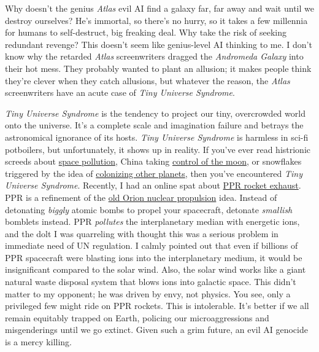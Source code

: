 Why doesn't the genius \emph{Atlas} evil AI find a galaxy far, far away
and wait until we destroy ourselves? He's immortal, so there's no hurry,
so it takes a few millennia for humans to self-destruct, big freaking
deal. Why take the risk of seeking redundant revenge? This doesn't seem
like genius-level AI thinking to me. I don't know why the retarded
\emph{Atlas} screenwriters dragged the \emph{Andromeda Galaxy} into
their hot mess. They probably wanted to plant an allusion; it makes
people think they're clever when they catch allusions, but whatever the
reason, the \emph{Atlas} screenwriters have an acute case of \emph{Tiny
Universe Syndrome}.

\emph{Tiny Universe Syndrome} is the tendency to project our tiny,
overcrowded world onto the universe. It's a complete scale and
imagination failure and betrays the astronomical ignorance of its hosts.
\emph{Tiny Universe Syndrome} is harmless in sci-fi potboilers, but
unfortunately, it shows up in reality. If you've ever read histrionic
screeds about
\href{https://www.weforum.org/agenda/2022/07/environmental-impact-space-debris-how-to-solve-it/}{space
pollution}, China taking
\href{https://www.npr.org/2024/05/06/1249249941/nasa-bill-nelson-moon-artemis-china-starliner}{control
of the moon}, or snowflakes triggered by the idea of
\href{https://theconversation.com/the-billionaire-space-race-reflects-a-colonial-mindset-that-fails-to-imagine-a-different-world-165235}{colonizing
other planets}, then you've encountered \emph{Tiny Universe Syndrome}.
Recently, I had an online spat about
\href{https://www.nasa.gov/directorates/stmd/niac/niac-studies/pulsed-plasma-rocket-ppr-shielded-fast-transits-for-humans-to-mars/}{PPR
rocket exhaust}. PPR is a refinement of the
\href{https://en.wikipedia.org/wiki/Project_Orion_(nuclear_propulsion)}{old
Orion nuclear propulsion} idea. Instead of detonating \emph{biggly}
atomic bombs to propel your spacecraft, detonate \emph{smallish}
bomblets instead. PPR \emph{pollutes} the interplanetary median with
energetic ions, and the dolt I was quarreling with thought this was a
serious problem in immediate need of UN regulation. I calmly pointed out
that even if billions of PPR spacecraft were blasting ions into the
interplanetary medium, it would be insignificant compared to the solar
wind. Also, the solar wind works like a giant natural waste disposal
system that blows ions into galactic space. This didn't matter to my
opponent; he was driven by envy, not physics. You see, only a privileged
few might ride on PPR rockets. This is intolerable. It's better if we
all remain equitably trapped on Earth, policing our microaggressions and
misgenderings until we go extinct. Given such a grim future, an evil AI
genocide is a mercy killing.

